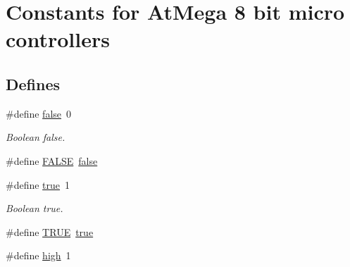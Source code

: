 \hypertarget{group___a_t_m_e_g_a___c_o_n_s_t_a_n_t_s}{\section{\-Constants for \-At\-Mega 8 bit micro controllers}
\label{group___a_t_m_e_g_a___c_o_n_s_t_a_n_t_s}
}
\subsection*{\-Defines}
\begin{DoxyCompactItemize}
\item 
\hypertarget{group___a_t_m_e_g_a___c_o_n_s_t_a_n_t_s_ga65e9886d74aaee76545e83dd09011727}{\#define \hyperlink{group___a_t_m_e_g_a___c_o_n_s_t_a_n_t_s_ga65e9886d74aaee76545e83dd09011727}{false}~0}\label{group___a_t_m_e_g_a___c_o_n_s_t_a_n_t_s_ga65e9886d74aaee76545e83dd09011727}

\begin{DoxyCompactList}\small\item\em \-Boolean false. \end{DoxyCompactList}\item 
\#define \hyperlink{group___a_t_m_e_g_a___c_o_n_s_t_a_n_t_s_gaa93f0eb578d23995850d61f7d61c55c1}{\-F\-A\-L\-S\-E}~\hyperlink{group___a_t_m_e_g_a___c_o_n_s_t_a_n_t_s_ga65e9886d74aaee76545e83dd09011727}{false}
\item 
\hypertarget{group___a_t_m_e_g_a___c_o_n_s_t_a_n_t_s_ga41f9c5fb8b08eb5dc3edce4dcb37fee7}{\#define \hyperlink{group___a_t_m_e_g_a___c_o_n_s_t_a_n_t_s_ga41f9c5fb8b08eb5dc3edce4dcb37fee7}{true}~1}\label{group___a_t_m_e_g_a___c_o_n_s_t_a_n_t_s_ga41f9c5fb8b08eb5dc3edce4dcb37fee7}

\begin{DoxyCompactList}\small\item\em \-Boolean true. \end{DoxyCompactList}\item 
\#define \hyperlink{group___a_t_m_e_g_a___c_o_n_s_t_a_n_t_s_gaa8cecfc5c5c054d2875c03e77b7be15d}{\-T\-R\-U\-E}~\hyperlink{group___a_t_m_e_g_a___c_o_n_s_t_a_n_t_s_ga41f9c5fb8b08eb5dc3edce4dcb37fee7}{true}
\item 
\hypertarget{group___a_t_m_e_g_a___c_o_n_s_t_a_n_t_s_ga9ce2716323ceb0e2133340a161f33a6c}{\#define \hyperlink{group___a_t_m_e_g_a___c_o_n_s_t_a_n_t_s_ga9ce2716323ceb0e2133340a161f33a6c}{high}~1}\label{group___a_t_m_e_g_a___c_o_n_s_t_a_n_t_s_ga9ce2716323ceb0e2133340a161f33a6c}


\end{DoxyCompactItemize}

